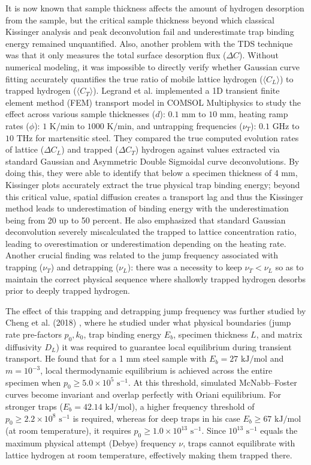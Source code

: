 \documentclass[a4paper,12pt,oneside]{report}
\begin{document}
It is now known that sample thickness affects the amount of hydrogen desorption from the sample, but the critical sample thickness beyond which classical Kissinger analysis and peak deconvolution fail and underestimate trap binding energy remained unquantified. Also, another problem with the TDS technique was that it only measures the total surface desorption flux ($\Delta C$). Without numerical modeling, it was impossible to directly verify whether Gaussian curve fitting accurately quantifies the true ratio of mobile lattice hydrogen ($\langle C_L \rangle$) to trapped hydrogen ($\langle C_T \rangle$). Legrand et al. \cite{Legrand2015} implemented a 1D transient finite element method (FEM) transport model in COMSOL Multiphysics to study the effect across various sample thicknesses ($d$): $0.1\text{ mm}$ to $10\text{ mm}$, heating ramp rates ($\phi$): $1\text{ K/min}$ to $1000\text{ K/min}$, and untrapping frequencies ($\nu_T$): $0.1\text{ GHz}$ to $10\text{ THz}$ for martensitic steel. They compared the true computed evolution rates of lattice ($\Delta C_L$) and trapped ($\Delta C_T$) hydrogen against values extracted via standard Gaussian and Asymmetric Double Sigmoidal curve deconvolutions. By doing this, they were able to identify that below a specimen thickness of 4 mm, Kissinger plots accurately extract the true physical trap binding energy; beyond this critical value, spatial diffusion creates a transport lag and thus the Kissinger method leads to underestimation of binding energy with the underestimation being from 20 up to 50 percent. He also emphasized that standard Gaussian deconvolution severely miscalculated the trapped to lattice concentration ratio, leading to overestimation or underestimation depending on the heating rate. Another crucial finding was related to the jump frequency associated with trapping ($\nu_T$) and detrapping ($\nu_L$): there was a necessity to keep $\nu_T < \nu_L$ so as to maintain the correct physical sequence where shallowly trapped hydrogen desorbs prior to deeply trapped hydrogen.

The effect of this trapping and detrapping jump frequency was further studied by Cheng et al. (2018) \cite{Cheng2018}, where he studied under what physical boundaries (jump rate pre-factors $p_0, k_0$, trap binding energy $E_b$, specimen thickness $L$, and matrix diffusivity $D_L$) it was required to guarantee local equilibrium during transient transport. He found that for a 1 mm steel sample with $E_b = 27\text{ kJ/mol}$ and $m = 10^{-3}$, local thermodynamic equilibrium is achieved across the entire specimen when $p_0 \ge 5.0 \times 10^5\text{ s}^{-1}$. At this threshold, simulated McNabb–Foster curves become invariant and overlap perfectly with Oriani equilibrium. For stronger traps ($E_b = 42.14\text{ kJ/mol}$), a higher frequency threshold of $p_0 \ge 2.2 \times 10^8\text{ s}^{-1}$ is required, whereas for deep traps in his case $E_b \ge 67\text{ kJ/mol}$ (at room temperature), it requires $p_0 \ge 1.0 \times 10^{13}\text{ s}^{-1}$. Since $10^{13}\text{ s}^{-1}$ equals the maximum physical attempt (Debye) frequency $\nu$, traps cannot equilibrate with lattice hydrogen at room temperature, effectively making them trapped there.
\end{document}
